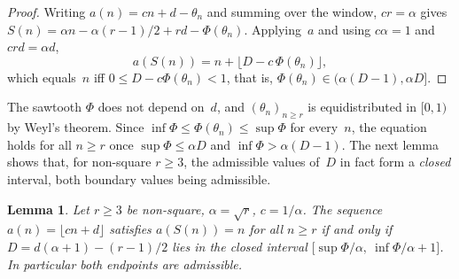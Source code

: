 \documentclass{birkjour}
\newtheorem{lemma}[theorem]{Lemma}
\theoremstyle{definition}
\theoremstyle{remark}
\newcommand{\fl}[1]{\lfloor #1 \rfloor}
\begin{document}
\begin{proof}
Writing $a(n)=cn+d-\theta_{n}$ and summing over the window,
$cr=\alpha$ gives
$S(n)=\alpha n-\alpha(r{-}1)/2+rd-\Phi(\theta_{n})$.
Applying~$a$ and using $c\alpha=1$ and $crd=\alpha d$,
\[
  a(S(n))=n+\bigl\lfloor D-c\,\Phi(\theta_{n})\bigr\rfloor,
\]
which equals~$n$ iff $0\le D-c\Phi(\theta_{n})<1$, that is,
$\Phi(\theta_{n})\in(\alpha(D-1),\alpha D]$.
\end{proof}

The sawtooth $\Phi$ does not depend on~$d$, and
$(\theta_{n})_{n\ge r}$ is equidistributed in $[0,1)$ by
Weyl's theorem. Since $\inf\Phi\le\Phi(\theta_{n})\le\sup\Phi$
for every~$n$, the equation holds for all $n\ge r$ once
$\sup\Phi\le\alpha D$ and $\inf\Phi>\alpha(D-1)$. The next
lemma shows that, for non-square $r\ge 3$, the admissible
values of~$D$ in fact form a \emph{closed} interval, both
boundary values being admissible.

\begin{lemma}\label{lem:endpoint}
Let $r\ge 3$ be non-square, $\alpha=\sqrt{r}$, $c=1/\alpha$.
The sequence $a(n)=\fl{cn+d}$ satisfies $a(S(n))=n$ for all
$n\ge r$ if and only if $D=d(\alpha+1)-(r{-}1)/2$ lies in the
closed interval
$\bigl[\sup\Phi/\alpha,\ \inf\Phi/\alpha+1\bigr]$. In
particular both endpoints are admissible.
\end{lemma}
\end{document}
